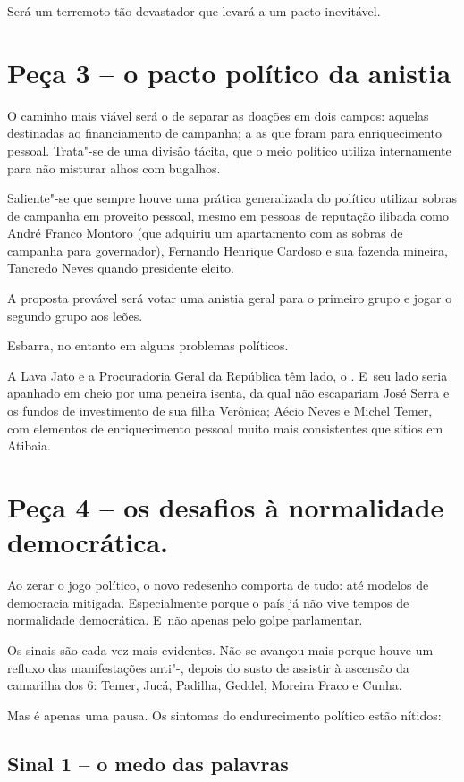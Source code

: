 Será um terremoto tão devastador que levará a um pacto inevitável.

\section{Peça 3 -- o pacto político da anistia}

O caminho mais viável será o de separar as doações em dois campos:
aquelas destinadas ao financiamento de campanha; a as que foram para
enriquecimento pessoal. Trata"-se de uma divisão tácita, que o meio
político utiliza internamente para não misturar alhos com bugalhos.

Saliente"-se que sempre houve uma prática generalizada do político
utilizar sobras de campanha em proveito pessoal, mesmo em pessoas de
reputação ilibada como André Franco Montoro (que adquiriu um apartamento
com as sobras de campanha para governador), Fernando Henrique Cardoso e
sua fazenda mineira, Tancredo Neves quando presidente eleito.

A proposta provável será votar uma anistia geral para o primeiro grupo e
jogar o segundo grupo aos leões.

Esbarra, no entanto em alguns problemas políticos.

A Lava Jato e a Procuradoria Geral da República têm lado, o . E~seu
lado seria apanhado em cheio por uma peneira isenta, da qual não
escapariam José Serra e os fundos de investimento de sua filha Verônica;
Aécio Neves e Michel Temer, com elementos de enriquecimento pessoal
muito mais consistentes que sítios em Atibaia.

\section{Peça 4 -- os desafios à normalidade democrática.}

Ao zerar o jogo político, o novo redesenho comporta de tudo: até modelos
de democracia mitigada. Especialmente porque o país já não vive tempos
de normalidade democrática. E~não apenas pelo golpe parlamentar.

Os sinais são cada vez mais evidentes. Não se avançou mais porque houve
um refluxo das manifestações anti"-, depois do susto de assistir à
ascensão da camarilha dos 6: Temer, Jucá, Padilha, Geddel, Moreira Fraco
e Cunha.

Mas é apenas uma pausa. Os sintomas do endurecimento político estão
nítidos:

\subsection{Sinal 1 -- o medo das palavras}

